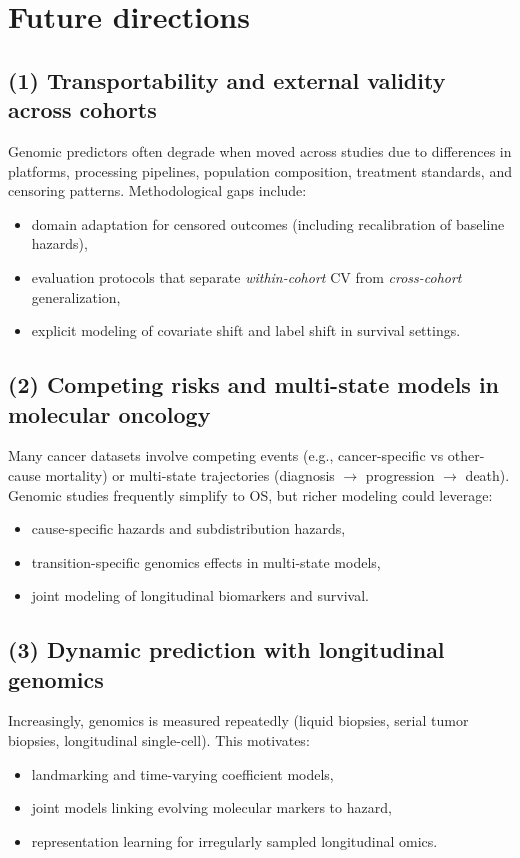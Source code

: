 \documentclass[11pt]{article}
\begin{document}
\section{Future directions}


\subsection{(1) Transportability and external validity across cohorts}
Genomic predictors often degrade when moved across studies due to differences in platforms, processing pipelines, population composition, treatment standards, and censoring patterns. Methodological gaps include:
\begin{itemize}
  \item domain adaptation for censored outcomes (including recalibration of baseline hazards),
  \item evaluation protocols that separate \emph{within-cohort} CV from \emph{cross-cohort} generalization,
  \item explicit modeling of covariate shift and label shift in survival settings.
\end{itemize}

\subsection{(2) Competing risks and multi-state models in molecular oncology}
Many cancer datasets involve competing events (e.g., cancer-specific vs other-cause mortality) or multi-state trajectories (diagnosis $\to$ progression $\to$ death). Genomic studies frequently simplify to OS, but richer modeling could leverage:
\begin{itemize}
  \item cause-specific hazards and subdistribution hazards,
  \item transition-specific genomics effects in multi-state models,
  \item joint modeling of longitudinal biomarkers and survival.
\end{itemize}

\subsection{(3) Dynamic prediction with longitudinal genomics}
Increasingly, genomics is measured repeatedly (liquid biopsies, serial tumor biopsies, longitudinal single-cell). This motivates:
\begin{itemize}
  \item landmarking and time-varying coefficient models,
  \item joint models linking evolving molecular markers to hazard,
  \item representation learning for irregularly sampled longitudinal omics.
\end{itemize}
\end{document}
